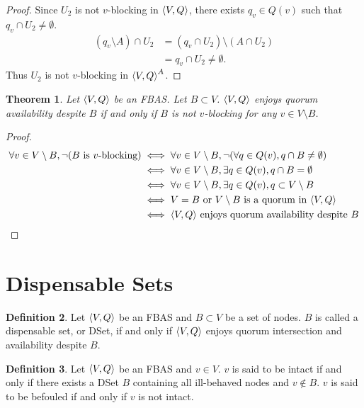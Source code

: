 \documentclass[12pt, psamsfonts]{amsart}
\newtheorem{thm}{Theorem}[section]
\theoremstyle{definition}
\newtheorem{defn}[thm]{Definition}
\theoremstyle{remark}
\numberwithin{equation}{section}
\begin{document}
\begin{proof}
    Since $U_2$ is not $v$-blocking in $\ev{V, Q}$, there exists $q_v \in Q(v)$ such that $q_v \cap U_2 \ne \emptyset$.
    \begin{align*}
        (q_v \setminus A) \cap U_2
            &= (q_v \cap U_2) \setminus (A \cap U_2) \\
            &= q_v \cap U_2 \ne \emptyset.
    \end{align*}
    Thus $U_2$ is not $v$-blocking in $\ev{V, Q}^A$.
\end{proof}

\begin{thm}\label{quorum_availability_v_blocking}
    Let $\ev{V, Q}$ be an FBAS\@.
    Let $B \subset V$.
    $\ev{V, Q}$ enjoys quorum availability despite $B$ if and only if $B$ is not $v$-blocking for any $v \in V \setminus B$.
\end{thm}

\begin{proof}
    \begin{align*}
        \forall v \in V \setminus B, \neg(\text{$B$ is $v$-blocking})
            &\iff \forall v \in V \setminus B, \neg(\forall q \in Q(v), q \cap B \ne \emptyset) \\
            &\iff \forall v \in V \setminus B, \exists q \in Q(v), q \cap B = \emptyset \\
            &\iff \forall v \in V \setminus B, \exists q \in Q(v), q \subset V \setminus B \\
            &\iff \text{$V = B$ or $V \setminus B$ is a quorum in $\ev{V, Q}$} \\
            &\iff \text{$\ev{V, Q}$ enjoys quorum availability despite $B$}
    \end{align*}
\end{proof}

\section{Dispensable Sets}

\begin{defn}\label{def_dset}
    Let $\ev{V, Q}$ be an FBAS and $B \subset V$ be a set of nodes.
    $B$ is called a dispensable set, or DSet, if and only if $\ev{V, Q}$ enjoys quorum intersection and availability despite $B$.
\end{defn}

\begin{defn}\label{def_intact_befouled}
    Let $\ev{V, Q}$ be an FBAS and $v \in V$.
    $v$ is said to be intact if and only if there exists a DSet $B$ containing all ill-behaved nodes and $v \notin B$.
    $v$ is said to be befouled if and only if $v$ is not intact.
\end{defn}
\end{document}
